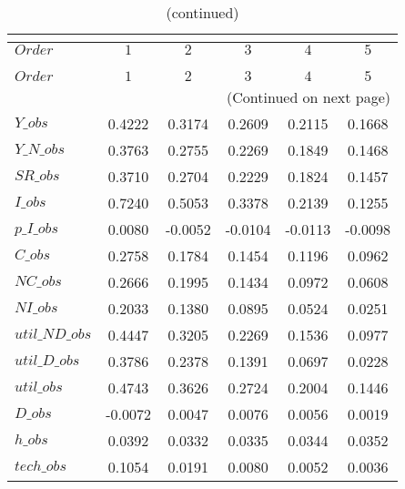  
\begin{center}
\begin{longtable}{lccccc} 
\caption{COEFFICIENTS OF AUTOCORRELATION}\\
 \label{Table:th_autocorr_matrix}\\
\toprule 
$Order          $	 & 	 $          1$	 & 	 $          2$	 & 	 $          3$	 & 	 $          4$	 & 	 $          5$\\
\midrule \endfirsthead 
\caption{(continued)}\\
 \toprule \\ 
$Order          $	 & 	 $          1$	 & 	 $          2$	 & 	 $          3$	 & 	 $          4$	 & 	 $          5$\\
\midrule \endhead 
\midrule \multicolumn{6}{r}{(Continued on next page)} \\ \bottomrule \endfoot 
\bottomrule \endlastfoot 
$Y\_obs         $	 & 	     0.4222	 & 	     0.3174	 & 	     0.2609	 & 	     0.2115	 & 	     0.1668 \\ 
$Y\_N\_obs      $	 & 	     0.3763	 & 	     0.2755	 & 	     0.2269	 & 	     0.1849	 & 	     0.1468 \\ 
$SR\_obs        $	 & 	     0.3710	 & 	     0.2704	 & 	     0.2229	 & 	     0.1824	 & 	     0.1457 \\ 
$I\_obs         $	 & 	     0.7240	 & 	     0.5053	 & 	     0.3378	 & 	     0.2139	 & 	     0.1255 \\ 
$p\_I\_obs      $	 & 	     0.0080	 & 	    -0.0052	 & 	    -0.0104	 & 	    -0.0113	 & 	    -0.0098 \\ 
$C\_obs         $	 & 	     0.2758	 & 	     0.1784	 & 	     0.1454	 & 	     0.1196	 & 	     0.0962 \\ 
$NC\_obs        $	 & 	     0.2666	 & 	     0.1995	 & 	     0.1434	 & 	     0.0972	 & 	     0.0608 \\ 
$NI\_obs        $	 & 	     0.2033	 & 	     0.1380	 & 	     0.0895	 & 	     0.0524	 & 	     0.0251 \\ 
$util\_ND\_obs  $	 & 	     0.4447	 & 	     0.3205	 & 	     0.2269	 & 	     0.1536	 & 	     0.0977 \\ 
$util\_D\_obs   $	 & 	     0.3786	 & 	     0.2378	 & 	     0.1391	 & 	     0.0697	 & 	     0.0228 \\ 
$util\_obs      $	 & 	     0.4743	 & 	     0.3626	 & 	     0.2724	 & 	     0.2004	 & 	     0.1446 \\ 
$D\_obs         $	 & 	    -0.0072	 & 	     0.0047	 & 	     0.0076	 & 	     0.0056	 & 	     0.0019 \\ 
$h\_obs         $	 & 	     0.0392	 & 	     0.0332	 & 	     0.0335	 & 	     0.0344	 & 	     0.0352 \\ 
$tech\_obs      $	 & 	     0.1054	 & 	     0.0191	 & 	     0.0080	 & 	     0.0052	 & 	     0.0036 \\ 
\end{longtable}
 \end{center}

